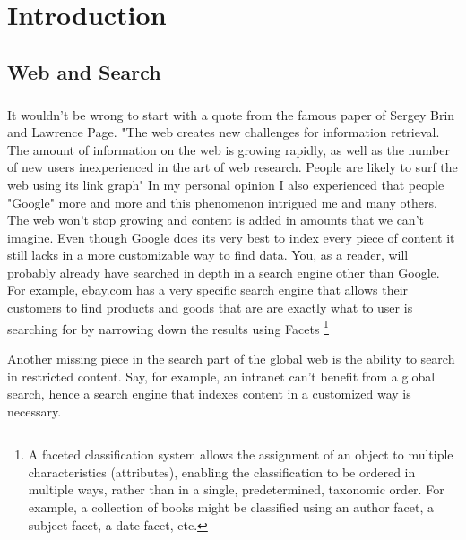 

\chapter{Introduction}

\section{Web and Search}

\paragraph{}
It wouldn't be wrong to start with a quote from the famous paper of Sergey Brin and Lawrence Page. "The web creates new challenges for information retrieval. The amount of information on the web is growing rapidly, as well as the number of new users inexperienced in the art of web research. People are likely to surf the web using its link graph" \cite{google_paper}
In my personal opinion I also experienced that people "Google" more and more and this phenomenon intrigued me and many others. The web won't stop growing and content is added in amounts that we can't imagine. Even though Google does its very best to index every piece of content it still lacks in a more customizable way to find data. You, as a reader, will probably already have searched in depth in a search engine other than Google. For example, ebay.com has a very specific search engine that allows their customers to find products and goods that are are exactly what to user is searching for by narrowing down the results using Facets \footnote{A faceted classification system allows the assignment of an object to multiple characteristics (attributes), enabling the classification to be ordered in multiple ways, rather than in a single, predetermined, taxonomic order. For example, a collection of books might be classified using an author facet, a subject facet, a date facet, etc.}

Another missing piece in the search part of the global web is the ability to search in restricted content. Say, for example, an intranet can't benefit from a global search, hence a search engine that indexes content in a customized way is necessary. 

